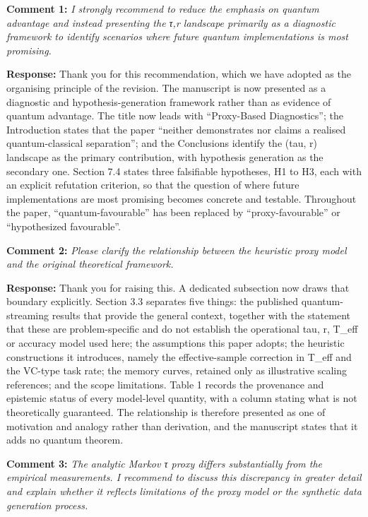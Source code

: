 \documentclass[
  11pt,
]{article}
\begin{document}
\textbf{Comment 1:} \emph{I strongly recommend to reduce the emphasis on
quantum advantage and instead presenting the τ,r landscape primarily as
a diagnostic framework to identify scenarios where future quantum
implementations is most promising.}

\textbf{Response:} Thank you for this recommendation, which we have
adopted as the organising principle of the revision. The manuscript is
now presented as a diagnostic and hypothesis-generation framework rather
than as evidence of quantum advantage. The title now leads with
``Proxy-Based Diagnostics''; the Introduction states that the paper
``neither demonstrates nor claims a realised quantum-classical
separation''; and the Conclusions identify the (tau, r) landscape as the
primary contribution, with hypothesis generation as the secondary one.
Section 7.4 states three falsifiable hypotheses, H1 to H3, each with an
explicit refutation criterion, so that the question of where future
implementations are most promising becomes concrete and testable.
Throughout the paper, ``quantum-favourable'' has been replaced by
``proxy-favourable'' or ``hypothesized favourable''.

\textbf{Comment 2:} \emph{Please clarify the relationship between the
heuristic proxy model and the original theoretical framework.}

\textbf{Response:} Thank you for raising this. A dedicated subsection
now draws that boundary explicitly. Section 3.3 separates five things:
the published quantum-streaming results that provide the general
context, together with the statement that these are problem-specific and
do not establish the operational tau, r, T\_eff or accuracy model used
here; the assumptions this paper adopts; the heuristic constructions it
introduces, namely the effective-sample correction in T\_eff and the
VC-type task rate; the memory curves, retained only as illustrative
scaling references; and the scope limitations. Table 1 records the
provenance and epistemic status of every model-level quantity, with a
column stating what is not theoretically guaranteed. The relationship is
therefore presented as one of motivation and analogy rather than
derivation, and the manuscript states that it adds no quantum theorem.

\textbf{Comment 3:} \emph{The analytic Markov τ proxy differs
substantially from the empirical measurements. I recommend to discuss
this discrepancy in greater detail and explain whether it reflects
limitations of the proxy model or the synthetic data generation
process.}
\end{document}
